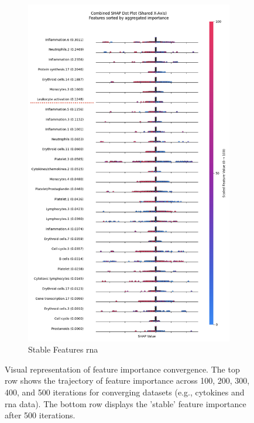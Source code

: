 \documentclass[12pt,a4paper]{report}
\begin{document}
\begin{figure}[h!]
\begin{subfigure}[b]{0.48\textwidth}
        \includegraphics[width=\textwidth]{images/stable_features_RNA.png}
        \caption{Stable Features \acrshort{rna}}
        \label{fig:stable_features_RNA}
    \end{subfigure}

    \caption[Feature Importance Trajectories and Stable Features 2]{Visual representation of feature importance convergence. The top row shows the trajectory of feature importance across 100, 200, 300, 400, and 500 iterations for converging datasets (e.g., cytokines and \acrshort{rna} data). The bottom row displays the 'stable' feature importance after 500 iterations.}
    \label{fig:feature_trajectories_plots2}
\end{figure}
\end{document}
